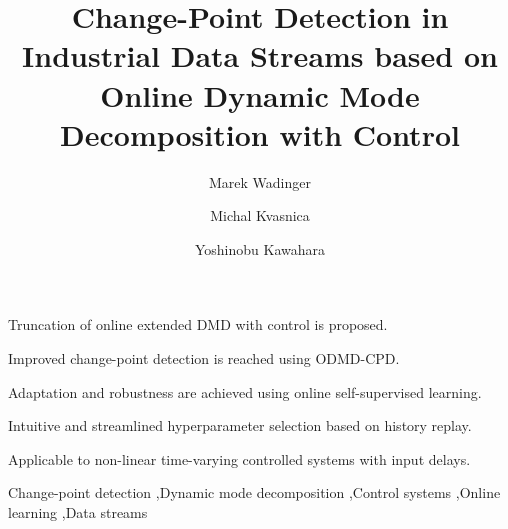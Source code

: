 \documentclass[preprint,12pt,authoryear]{elsarticle}
\begin{document}
\begin{frontmatter}


	\title{Change-Point Detection in Industrial Data Streams based on Online Dynamic Mode Decomposition with Control}

	\author[aff1,aff2]{Marek Wadinger}

	\author[aff1]{Michal Kvasnica}

	\author[aff2]{Yoshinobu Kawahara}



	\begin{abstract}
		
	\end{abstract}


	\begin{highlights}
		\item Truncation of online extended DMD with control is proposed.
		\item Improved change-point detection is reached using ODMD-CPD.
		\item Adaptation and robustness are achieved using online self-supervised learning.
		\item Intuitive and streamlined hyperparameter selection based on history replay.
		\item Applicable to non-linear time-varying controlled systems with input delays.
	\end{highlights}


	\begin{keyword}
		Change-point detection
		\sep{Dynamic mode decomposition}
		\sep{Control systems}
		\sep{Online learning}
		\sep{Data streams}
	\end{keyword}

\end{frontmatter}
\end{document}
